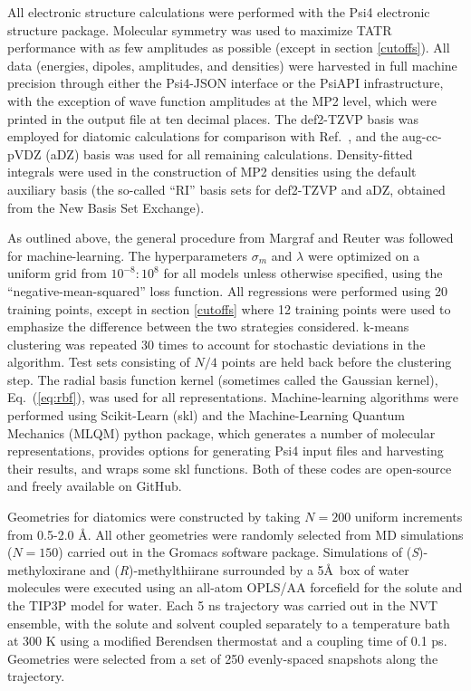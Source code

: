 All electronic structure calculations were performed with the Psi4\cite{Parrish2017} electronic structure package. Molecular symmetry was used to maximize TATR performance with as few amplitudes as possible (except in section \ref{cutoffs}). All data (energies, dipoles, amplitudes, and densities) were harvested in full machine precision through either the Psi4-JSON interface or the PsiAPI infrastructure, with the exception of wave function amplitudes at the MP2 level, which were printed in the output file at ten decimal places. The def2-TZVP\cite{Weigend2005} basis was employed for diatomic calculations for comparison with Ref.~, and the aug-cc-pVDZ (aDZ) basis\cite{Dunning1989,Woon1994} was used for all remaining calculations. Density-fitted integrals were used in the construction of MP2 densities using the default auxiliary basis (the so-called ``RI'' basis sets for def2-TZVP\cite{Hattig2005} and aDZ\cite{Weigend2002}, obtained from the New Basis Set Exchange\cite{Pritchard2019}). 

As outlined above, the general procedure from Margraf and Reuter\cite{Margraf2018} was followed for machine-learning. 
The hyperparameters $\sigma_m$ and $\lambda$ were optimized on a uniform grid from $10^{-8}:10^{8}$ for all models unless otherwise specified, using the ``negative-mean-squared'' loss function. 
All regressions were performed using 20 training points, except in section \ref{cutoffs} where 12 training points were used to emphasize the difference between the two strategies considered. 
k-means clustering was repeated 30 times to account for stochastic deviations in the algorithm. 
Test sets consisting of $N/4$ points are held back before the clustering step.
The radial basis function kernel (sometimes called the Gaussian kernel), Eq.~(\ref{eq:rbf}), was used for all representations. 
Machine-learning algorithms were performed using Scikit-Learn (skl) \cite{Pedregosa2011} and the Machine-Learning Quantum Mechanics (MLQM) python package\cite{mlqm}, which generates a number of molecular representations, provides options for generating Psi4 input files and harvesting their results, and wraps some skl functions. 
Both of these codes are open-source and freely available on GitHub.

Geometries for diatomics were constructed by taking $N = 200$ uniform increments from 0.5-2.0 \AA . All other geometries were randomly selected from MD simulations ($N = 150$) carried out in the Gromacs\cite{Pronk2013} software package.
Simulations of (\textit{S})-methyloxirane and (\textit{R})-methylthiirane surrounded by a 5\AA\ box of water molecules were executed using an all-atom OPLS/AA forcefield\cite{Jorgensen1996} for the solute and the TIP3P model for water\cite{Jorgensen1983}. Each 5 ns trajectory was carried out in the NVT
ensemble, with the solute and solvent coupled separately to a temperature bath
at 300 K using a modified Berendsen thermostat and a coupling time of 0.1 ps. Geometries were selected from a set of 250 evenly-spaced snapshots along the trajectory.

